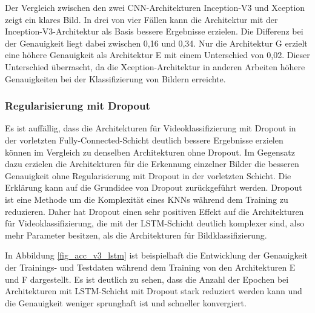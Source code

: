 Der Vergleich zwischen den zwei \ac{CNN}-Architekturen Inception-V3 und Xception zeigt ein klares Bild. In drei von vier Fällen kann die Architektur mit der Inception-V3-Architektur als Basis bessere Ergebnisse erzielen. Die Differenz bei der Genauigkeit liegt dabei zwischen 0,16 und 0,34. Nur die Architektur G erzielt eine höhere Genauigkeit als Architektur E mit einem Unterschied von 0,02. Dieser Unterschied überrascht, da die Xception-Architektur in anderen Arbeiten \cite{chollet2017xception} höhere Genauigkeiten bei der Klassifizierung von Bildern erreichte.

\subsubsection{Regularisierung mit Dropout}

Es ist auffällig, dass die Architekturen für Videoklassifizierung mit Dropout in der vorletzten Fully-Connected-Schicht deutlich bessere Ergebnisse erzielen können im Vergleich zu denselben Architekturen ohne Dropout. Im Gegensatz dazu erzielen die Architekturen für die Erkennung einzelner Bilder die besseren Genauigkeit ohne Regularisierung mit Dropout in der vorletzten Schicht. Die Erklärung kann auf die Grundidee von Dropout zurückgeführt werden. Dropout ist eine Methode um die Komplexität eines \acp{KNN} während dem Training zu reduzieren. Daher hat Dropout einen sehr positiven Effekt auf die Architekturen für Videoklassifizierung, die mit der \ac{LSTM}-Schicht deutlich komplexer sind, also mehr Parameter besitzen, als die Architekturen für Bildklassifizierung.

In Abbildung \ref{fig_acc_v3_lstm} ist beispielhaft die Entwicklung der Genauigkeit der Trainings- und Testdaten während dem Training von den Architekturen E und F dargestellt. Es ist deutlich zu sehen, dass die Anzahl der Epochen bei Architekturen mit \ac{LSTM}-Schicht mit Dropout stark reduziert werden kann und die Genauigkeit weniger sprunghaft ist und schneller konvergiert.

